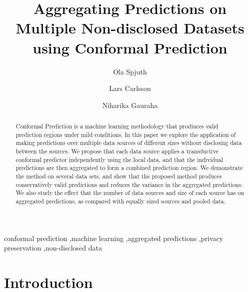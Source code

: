\documentclass[main]{subfiles}
\begin{document}
\begin{frontmatter}

\title{Aggregating Predictions on Multiple Non-disclosed Datasets using Conformal Prediction}

\author[label1]{Ola Spjuth}
\author[label2,label3]{Lars Carlsson}
\author[label1]{Niharika Gauraha}


\address[label1]{Department of Pharmaceutical Biosciences \\
       Uppsala University\\
       Uppsala, Sweden}
\address[label2]{Department of Computer Science, \\Royal Holloway, University of London, \\Egham Hill, Egham, Surrey, United Kingdom}
\address[label3]{Stena Line, Gothenburg, Sweden}


\begin{abstract}
Conformal Prediction is a machine learning methodology that prodiuces valid prediction regions under mild conditions. 
In this paper we explore the application of making predictions over multiple data sources of different sizes without disclosing data between the sources.
We propose that each data source applies a transductive conformal predictor independently using the local data, and that the individual predictions are then aggregated to form a combined prediction region. We demonstrate the method on several data sets, and show that the proposed method produces conservatively valid predictions and reduces the variance in the aggregated predictions. We also study the effect that the number of data sources and size of each source has on aggregated predictions, as compared with equally sized sources and pooled data.
\end{abstract}
\begin{keyword}


conformal prediction \sep machine learning \sep aggregated predictions \sep privacy preservation \sep non-disclosed data
\end{keyword}

\end{frontmatter}

\section{Introduction}
\end{document}
